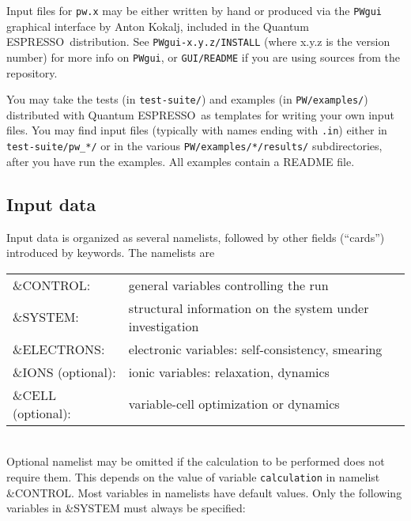 \documentclass[12pt,a4paper]{article}
\def\qe{{\sc Quantum ESPRESSO}}
\begin{document}
Input files for \texttt{pw.x} may be either written by hand 
or produced via the \texttt{PWgui} graphical interface by Anton Kokalj, 
included in the \qe\ distribution. See \texttt{PWgui-x.y.z/INSTALL}
(where x.y.z is the version number) for more info on \texttt{PWgui}, 
or \texttt{GUI/README} if you are using sources from the repository.
    
You may take the tests (in \texttt{test-suite/}) and examples
(in \texttt{PW/examples/}) distributed with \qe\ as templates for
writing your own input files. You may find input files (typically
with names ending with \texttt{.in}) either in \texttt{test-suite/pw\_*/}
or in the various \texttt{PW/examples/*/results/} subdirectories,
after you have run the examples. All examples contain a README file.

\subsection{Input data}

Input data 
is organized as several namelists, followed by other fields (``cards'')
introduced by keywords. The namelists are

\begin{tabular}{ll}
      \&CONTROL:& general variables controlling the run\\
      \&SYSTEM: &structural information on the system under investigation\\
      \&ELECTRONS: &electronic variables: self-consistency, smearing\\
      \&IONS (optional): &ionic variables: relaxation, dynamics\\
      \&CELL (optional): &variable-cell optimization or dynamics\\
\end{tabular}    \\
Optional namelist may be omitted if the calculation to be performed
does not require them. This depends on the value of variable 
\texttt{calculation}
in namelist \&CONTROL. Most variables in namelists have default values. Only
the following variables in \&SYSTEM must always be specified:
\end{document}
